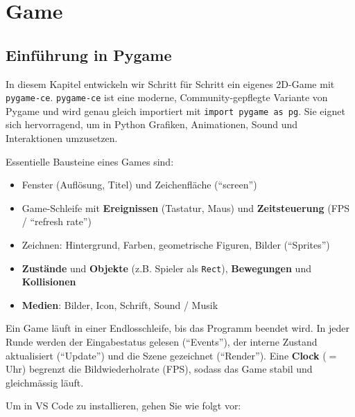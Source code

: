 \chapter{Game}\label{ch:K08_Game}

\section{Einführung in Pygame}
In diesem Kapitel entwickeln wir Schritt für Schritt ein eigenes 2D-Game mit \texttt{pygame-ce}. \texttt{pygame-ce} ist eine moderne, Community-gepflegte Variante von Pygame und wird genau gleich importiert mit \lstinline|import pygame as pg|. Sie eignet sich hervorragend, um in Python Grafiken, Animationen, Sound und Interaktionen umzusetzen.

Essentielle Bausteine eines Games sind:
\begin{itemize}
    \item Fenster (Auflösung, Titel) und Zeichenfläche (\enquote{screen})
    \item Game-Schleife mit \textbf{Ereignissen} (Tastatur, Maus) und \textbf{Zeitsteuerung} (\gls{FPS} / \enquote{refresh rate})
    \item Zeichnen: Hintergrund, Farben, geometrische Figuren, Bilder (\enquote{Sprites})
    \item \textbf{Zustände} und \textbf{Objekte} (z.B. Spieler als \lstinline|Rect|), \textbf{Bewegungen} und \textbf{Kollisionen}
    \item \textbf{Medien}: Bilder, Icon, Schrift, Sound / Musik
\end{itemize}

\begin{mydefinition}
Ein Game läuft in einer Endlosschleife, bis das Programm beendet wird. In jeder Runde werden der Eingabestatus gelesen (\enquote{Events}), der interne Zustand aktualisiert (\enquote{Update}) und die Szene gezeichnet (\enquote{Render}). Eine \textbf{Clock} ($=$ Uhr) begrenzt die Bildwiederholrate (\gls{FPS}), sodass das Game stabil und gleichmässig läuft.
\end{mydefinition}

Um  in VS Code zu installieren, gehen Sie wie folgt vor:

